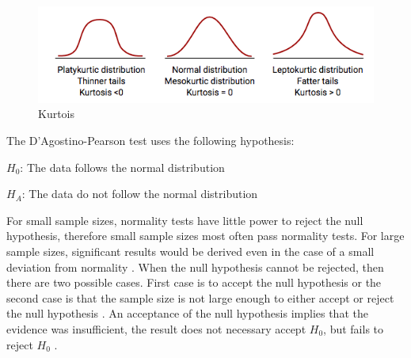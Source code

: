\begin{figure}[h!]
	\centering
	\includegraphics[width=0.7\linewidth]{fig/kurtois}
	\caption{Kurtois \citep{MedCalcSoftwarebvba2017}}
	\label{fig:kurtois}
\end{figure}


The D'Agostino-Pearson test uses the following hypothesis:\newline

\centerline{$H_{0}$: The data follows the normal distribution} 
\centerline{$H_{A}$: The data do not follow the normal distribution}

For small sample sizes, normality tests have little power to reject the null hypothesis, therefore small sample sizes most often pass normality tests. For large sample sizes, significant results would be derived even in the case of a small deviation from normality \citep{Pearson2006}. When the null hypothesis cannot be rejected, then there are two possible cases. First case is to accept the null hypothesis or the second case is that the sample size is not large enough to either accept or reject the null hypothesis \citep{ThePennsylvaniaStateUniversity2017}. An acceptance of the null hypothesis implies that the evidence was insufficient, the result does not necessary accept $H_{0}$, but fails to reject $H_{0}$ \citep{Walpole2012}.  




